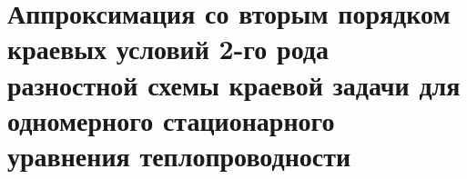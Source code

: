 \documentclass[__main__.tex]{subfiles}
\begin{document}
\section{Аппроксимация со вторым порядком краевых условий 2-го рода разностной схемы краевой задачи для одномерного стационарного уравнения теплопроводности}
\end{document}
